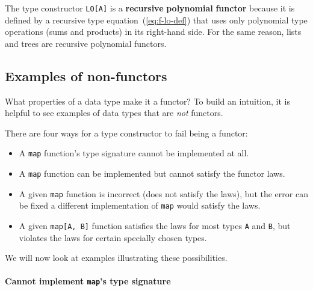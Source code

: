 The type constructor \lstinline!LO[A]! is a \textbf{recursive} \textbf{polynomial}
\textbf{functor} because it is defined by a recursive type equation~(\ref{eq:f-lo-def})
that uses only polynomial type operations (sums and products) in its
right-hand side. For the same reason, lists and trees are recursive
polynomial functors.

\subsection{Examples of non-functors\label{subsec:Examples-of-non-functors}}

What properties of a data type make it a functor? To build an intuition,
it is helpful to see examples of data types that are \emph{not} functors.

There are four ways for a type constructor to fail being a functor:
\begin{itemize}
\item A \lstinline!map! function's type signature cannot be implemented
at all.
\item A \lstinline!map! function can be implemented but cannot satisfy
the functor laws.
\item A given \lstinline!map! function is incorrect (does not satisfy the
laws), but the error can be fixed \textendash{} a different implementation
of \lstinline!map! would satisfy the laws.
\item A given \lstinline!map[A, B]! function satisfies the laws for most
types \lstinline!A! and \lstinline!B!, but violates the laws for
certain specially chosen types.
\end{itemize}
We will now look at examples illustrating these possibilities.

\paragraph{Cannot implement \lstinline!map!'s type signature}


